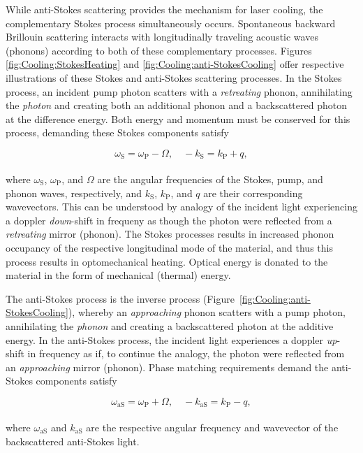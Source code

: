 While anti-Stokes scattering provides the mechanism for laser cooling, the complementary Stokes process simultaneously occurs. Spontaneous backward Brillouin scattering interacts with longitudinally traveling acoustic waves (phonons) according to both of these complementary processes. Figures \ref{fig:Cooling:StokesHeating} and \ref{fig:Cooling:anti-StokesCooling} offer respective illustrations of these Stokes and anti-Stokes scattering processes. In the Stokes process, an incident pump photon scatters with a \emph{retreating} phonon, annihilating the \emph{photon} and creating both an additional phonon and a backscattered photon at the difference energy. Both energy and momentum must be conserved for this process, demanding these Stokes components satisfy

\begin{equation}
\omega_{\mathrm{S}} = \omega_{\mathrm{P}} - \Omega,
\quad
-k_{\mathrm{S}} = k_{\mathrm{P}} + q,
\end{equation}
\\
where \(\omega_{\mathrm{S}}\), \(\omega_{\mathrm{P}}\), and \(\Omega\) are the angular frequencies of the Stokes, pump, and phonon waves, respectively, and \(k_{\mathrm{S}}\), \(k_{\mathrm{P}}\), and \(q\) are their corresponding wavevectors. This can be understood by analogy of the incident light experiencing a doppler \textit{down}-shift in frequeny as though the photon were reflected from a \emph{retreating} mirror (phonon). The Stokes processes results in increased phonon occupancy of the respective longitudinal mode of the material, and thus this process results in optomechanical heating. Optical energy is donated to the material in the form of mechanical (thermal) energy.

The anti-Stokes process is the inverse process (Figure~\ref{fig:Cooling:anti-StokesCooling}), whereby an \textit{approaching} phonon scatters with a pump photon, annihilating the \textit{phonon} and creating a backscattered photon at the additive energy. In the anti-Stokes process, the incident light experiences a doppler \textit{up}-shift in frequency as if, to continue the analogy, the photon were reflected from an \emph{approaching} mirror (phonon). Phase matching requirements demand the anti-Stokes components satisfy

\begin{equation}
  \omega_{\mathrm{aS}} = \omega_{\mathrm{P}} + \Omega,
  \quad
  -k_{\mathrm{aS}} = k_{\mathrm{P}} - q,
  \label{eq:Cooling:anti-Stokes Phase Matching}
\end{equation}
\\
where \(\omega_{\mathrm{aS}}\) and \(k_{\mathrm{aS}}\) are the respective angular frequency and wavevector of the backscattered anti-Stokes light.

